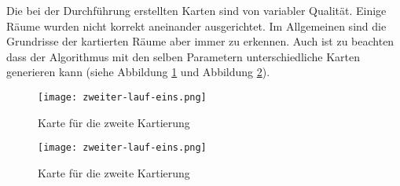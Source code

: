 Die bei der Durchführung erstellten Karten sind von variabler Qualität. Einige Räume wurden nicht korrekt aneinander ausgerichtet. Im Allgemeinen sind die Grundrisse der kartierten Räume aber immer zu erkennen. Auch ist zu beachten dass der Algorithmus mit den selben Parametern unterschiedliche Karten generieren kann (siehe Abbildung \ref{fig:zweiter-lauf-eins} und Abbildung \ref{fig:zweiter-lauf-zwei}).

\begin{figure}[!htb]
	\centering
	\texttt{[image: zweiter-lauf-eins.png]}
	\caption{Karte für die zweite Kartierung}
	\label{fig:zweiter-lauf-eins}
\end{figure}

\begin{figure}[!htb]
	\centering
	\texttt{[image: zweiter-lauf-eins.png]}
	\caption{Karte für die zweite Kartierung}
	\label{fig:zweiter-lauf-zwei}
\end{figure}


